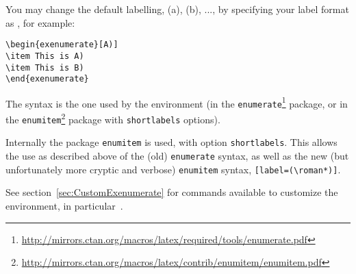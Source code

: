 \documentclass[11pt,a4paper]{article}
\begin{document}
You may change the default labelling, (a), (b), ..., by specifying your label format as
, for example:
\begin{pkgverbatim}
\begin{verbatim}
\begin{exenumerate}[A)]
\item This is A)
\item This is B)
\end{exenumerate}
\end{verbatim}
\end{pkgverbatim}
The syntax is the one used by the  environment (in the
\texttt{enumerate}\footnote{\url{http://mirrors.ctan.org/macros/latex/required/tools/enumerate.pdf}}
package, or in the
\texttt{enumitem}\footnote{\url{http://mirrors.ctan.org/macros/latex/contrib/enumitem/enumitem.pdf}}
package with \texttt{shortlabels} options).

\begin{pkgtip}
  Internally the package \texttt{enumitem} is used, with option \texttt{shortlabels}. This
  allows the use as described above of the (old) \texttt{enumerate} syntax, as well as the
  new (but unfortunately more cryptic and verbose) \texttt{enumitem} syntax,
  \texttt{[label=(\textbackslash roman*)]}.

  See section~\ref{sec:CustomExenumerate} for commands available to customize the
   environment, in particular~.
\end{pkgtip}
\end{document}

